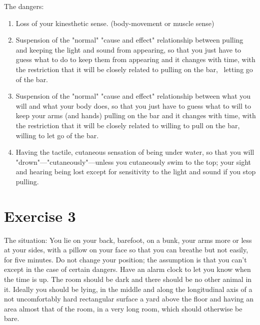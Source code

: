 The dangers: 
\begin{enumerate}
\item Loss of your kinesthetic sense. (body-movement or muscle sense) 
\item Suspension of the "normal" "cause and effect" relationship between 
pulling and keeping the light and sound from appearing, so that you just 
have to guess what to do to keep them from appearing and it changes with 
time, with the restriction that it will be closely related to pulling on the bar, 
\eg\ letting go of the bar. 
\item Suspension of the "normal" "cause and effect" relationship between what 
you will and what your body does, so that you just have to guess what to 
will to keep your arms (and hands) pulling on the bar and it changes with 
time, with the restriction that it will be closely related to willing to pull on 
the bar, \eg willing to let go of the bar. 
\item Having the tactile, cutaneous sensation of being under water, so that 
you will "drown"---"cutaneously"---unless you cutaneously swim to the top; 
your sight and hearing being lost except for sensitivity to the light and sound 
if you stop pulling. 
\end{enumerate}

\section*{Exercise 3}

The situation: You lie on your back, barefoot, on a bunk, your arms more 
or less at your sides, with a pillow on your face so that you can breathe but 
not easily, for five minutes. Do not change your position; the assumption is 
that you can't except in the case of certain dangers. Have an alarm clock 
to let you know when the time is up. The room should be dark and there 
should be no other animal in it. Ideally you should be lying, in the middle 
and along the longitudinal axis of a not uncomfortably hard rectangular 
surface a yard above the floor and having an area almost that of the room, 
in a very long room, which should otherwise be bare. 

